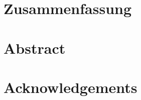 \pagestyle{headings}

\section*{Zusammenfassung}

\clearpage

\section*{Abstract}


\clearpage

\section*{Acknowledgements}

\clearpage
\renewcommand\pagemark{\usekomafont{pagenumber}\thepage}
\setcounter{tocdepth}{2}
\tableofcontents
